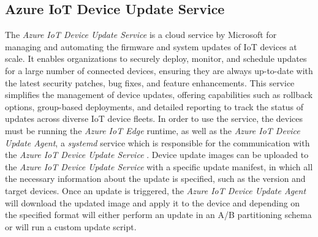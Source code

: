 \subsection{Azure IoT Device Update Service}
\label{sec:azure-iot-device-update-service}
The \textit{Azure IoT Device Update Service} is a cloud service by Microsoft
for managing and automating the firmware and system updates of \ac{IoT} devices at scale.
It enables organizations to securely deploy, monitor, and schedule updates for
a large number of connected devices, ensuring they are always up-to-date with
the latest security patches, bug fixes, and feature enhancements. This service
simplifies the management of device updates, offering capabilities such as
rollback options, group-based deployments, and detailed reporting to track the
status of updates across diverse \ac{IoT} device fleets. In order to use the service,
the devices must be running the \textit{Azure IoT Edge} runtime, as well as the
\textit{Azure IoT Device Update Agent}, a \textit{systemd} service which is
responsible for the communication with the \textit{Azure IoT Device Update Service}
\cite{msdoc-adu}. Device update images can be uploaded to the
\textit{Azure IoT Device Update Service} with a specific update manifest, in
which all the necessary information about the update is specified, such as the
version and target devices. Once an update is triggered, the \textit{Azure IoT Device Update
Agent} will download the updated image and apply it to the device and depending
on the specified format will either perform an update in an A/B partitioning
schema or will run a custom update script.


